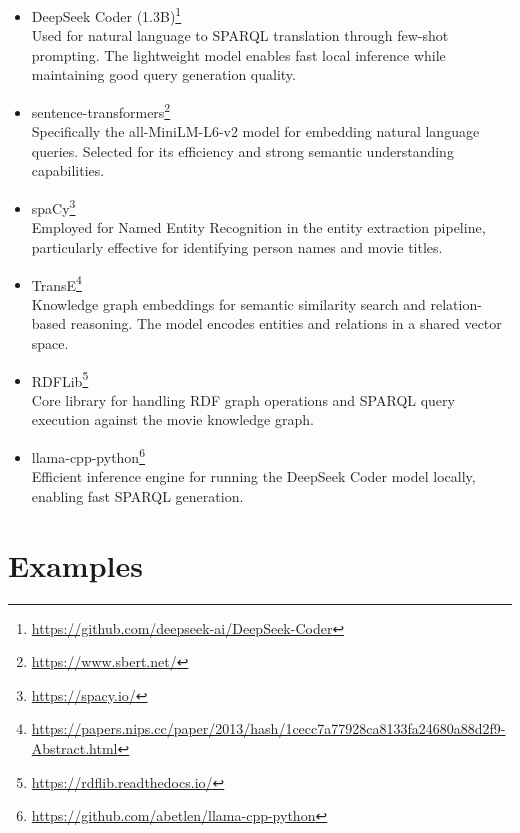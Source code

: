 \documentclass{article}
\begin{document}
\begin{itemize}
    \item DeepSeek Coder (1.3B)\footnote{\url{https://github.com/deepseek-ai/DeepSeek-Coder}} \\
    Used for natural language to SPARQL translation through few-shot prompting. The lightweight model enables fast local inference while maintaining good query generation quality.

    \item sentence-transformers\footnote{\url{https://www.sbert.net/}} \\
    Specifically the all-MiniLM-L6-v2 model for embedding natural language queries. Selected for its efficiency and strong semantic understanding capabilities.

    \item spaCy\footnote{\url{https://spacy.io/}} \\
    Employed for Named Entity Recognition in the entity extraction pipeline, particularly effective for identifying person names and movie titles.

    \item TransE\footnote{\url{https://papers.nips.cc/paper/2013/hash/1cecc7a77928ca8133fa24680a88d2f9-Abstract.html}} \\
    Knowledge graph embeddings for semantic similarity search and relation-based reasoning. The model encodes entities and relations in a shared vector space.

    \item RDFLib\footnote{\url{https://rdflib.readthedocs.io/}} \\
    Core library for handling RDF graph operations and SPARQL query execution against the movie knowledge graph.

    \item llama-cpp-python\footnote{\url{https://github.com/abetlen/llama-cpp-python}} \\
    Efficient inference engine for running the DeepSeek Coder model locally, enabling fast SPARQL generation.
\end{itemize}

\section{Examples}
\end{document}
